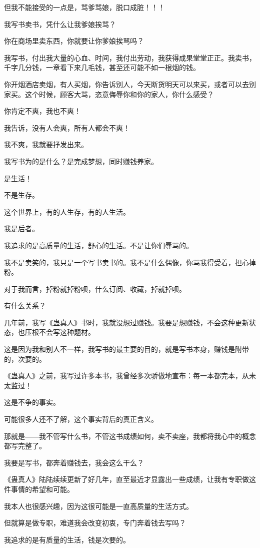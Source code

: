 \begin{this_body}
但我不能接受的一点是，骂爹骂娘，脱口成脏！！！

我写书卖书，凭什么让我爹娘挨骂？

你在商场里卖东西，你就要让你爹娘挨骂吗？

我写书，付出我大量的心血、时间，我付出劳动，我获得成果堂堂正正。我卖书，千字几分钱，一章看下来几毛钱，甚至还可能不如一根烟的钱。

你开烟酒店卖烟，有人买烟，你告诉别人，今天断货明天可以来买，或者可以去别家买。这个时候，顾客大骂，恣意侮辱你和你的家人，你什么感受？

你肯定不爽，我也不爽！

我告诉，没有人会爽，所有人都会不爽！

我不爽，我就要抒发出来。

我写书为的是什么？是完成梦想，同时赚钱养家。

是生活！

不是生存。

这个世界上，有的人生存，有的人生活。

我是后者。

我追求的是高质量的生活，舒心的生活。不是让你们辱骂的。

我不是卖笑的，我只是一个写书卖书的。我不是什么偶像，你骂我得受着，担心掉粉。

对于我而言，掉粉就掉粉呗，什么订阅、收藏，掉就掉呗。

有什么关系？

几年前，我写《蛊真人》书时，我就没想过赚钱。我要是想赚钱，不会这种更新状态，也压根不会写这种题材。

这是因为我和别人不一样，我写书的最主要的目的，就是写书本身，赚钱是附带的，次要的。

《蛊真人》之前，我写过许多本书，我曾经多次骄傲地宣布：每一本都完本，从未太监过！

这是不争的事实。

可能很多人还不了解，这个事实背后的真正含义。

那就是――我不管写什么书，不管这书成绩如何，卖不卖座，我都将我心中的概念都写完整了。

我要是写书，都奔着赚钱去，我会这么干么？

《蛊真人》陆陆续续更新了好几年，直至最近才显露出一些成绩，让我有专职做这件事情的希望和可能。

我本人也很感兴趣，因为这很可能是一直高质量的生活方式。

但就算是做专职，难道我会改变初衷，专门奔着钱去写吗？

我追求的是有质量的生活，钱是次要的。


\end{this_body}
